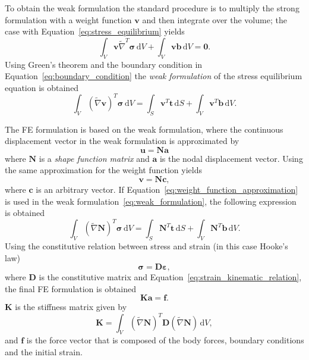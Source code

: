 To obtain the weak formulation the standard procedure is to multiply the strong formulation with a weight function $\mathbf{v}$ and then integrate over the volume; the case with Equation~\eqref{eq:stress_equilibrium} yields
\begin{equation}
	\int_V \mathbf{v} \widetilde{\nabla}^T \bm{\sigma} \,\mathrm{d}V + \int_V \mathbf{v} \mathbf{b} \,\mathrm{d}V = \bm{0}.
\end{equation}
Using Green's theorem and the boundary condition in Equation~\eqref{eq:boundary_condition} the \textit{weak formulation} of the stress equilibrium equation is obtained
\begin{equation}
	\label{eq:weak_formulation}
	\int_V \left(\widetilde{\nabla} \mathbf{v}\right)^T \bm{\sigma} \,\mathrm{d}V = \int_S \mathbf{v}^T \mathbf{t} \,\mathrm{d}S + \int_V \mathbf{v}^T \mathbf{b} \,\mathrm{d}V.
\end{equation}

The FE formulation is based on the weak formulation, where the continuous displacement vector in the weak formulation is approximated by
\begin{equation}
	\label{eq:displacement_approximation}
	\mathbf{u} = \mathbf{N}\mathbf{a}
\end{equation}
where $\mathbf{N}$ is a \textit{shape function matrix} and $\mathbf{a}$ is the nodal displacement vector. Using the same approximation for the weight function yields
\begin{equation}
	\label{eq:weight_function_approximation}
	\mathbf{v} = \mathbf{N}\mathbf{c},
\end{equation}
where $\mathbf{c}$ is an arbitrary vector. If Equation~\eqref{eq:weight_function_approximation} is used in the weak formulation~\eqref{eq:weak_formulation}, the following expression is obtained
\begin{equation}
	\int_V \left(\widetilde{\nabla} \mathbf{N}\right)^T \bm{\sigma} \,\mathrm{d}V = \int_S \mathbf{N}^T \mathbf{t} \,\mathrm{d}S + \int_V \mathbf{N}^T \mathbf{b} \,\mathrm{d}V.
\end{equation}
Using the constitutive relation between stress and strain (in this case Hooke's law)
\begin{equation}
	\label{eq:hookes_law}
	\bm{\sigma} = \mathbf{D}\bm{\varepsilon},
\end{equation}
where $\mathbf{D}$ is the constitutive matrix and Equation~\ref{eq:strain_kinematic_relation}, the final FE formulation is obtained
\begin{equation}
	\label{eq:fe_formualtion}
	\mathbf{K}\mathbf{a} = \mathbf{f}.
\end{equation}
$\mathbf{K}$ is the stiffness matrix given by
\begin{equation}
	\mathbf{K} = \int_V \left(\widetilde{\nabla} \mathbf{N}\right)^T \mathbf{D} \left(\widetilde{\nabla} \mathbf{N}\right) \,\mathrm{d}V,
\end{equation}
and $\mathbf{f}$ is the force vector that is composed of the body forces, boundary conditions and the initial strain.

